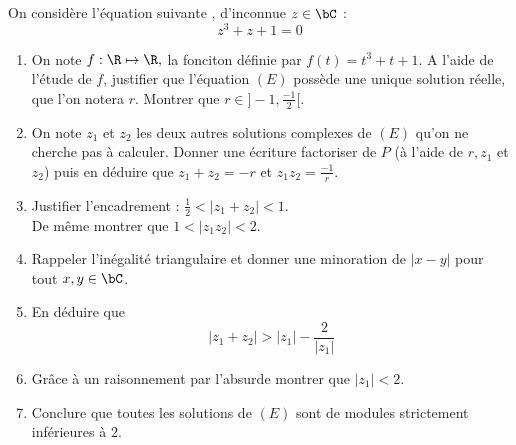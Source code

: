 \documentclass[a4paper, 11pt,reqno]{article}
\begin{document}
\begin{exercice}
On considère l'équation suivante , d'inconnue $z\in \bC$ : 
\begin{equation}\tag{$E$}
z^3 +z+1=0
\end{equation} 



\begin{enumerate}
\item On note $f : \R\mapsto \R, $ la fonciton définie par $f(t) = t^3+t+1.$
A l'aide de l'étude de $f$, justifier que l'équation $(E)$ possède une unique solution réelle, que l'on notera $r$. Montrer que $r \in ]-1, \frac{-1}{2}[$.
\item On note $z_1$ et $z_2$ les deux autres solutions complexes de $(E)$ qu'on ne cherche pas à calculer. %
Donner une écriture factoriser de $P$ (à l'aide de $r, z_1$ et $z_2$) puis   en déduire que $z_1+z_2=-r$ et $z_1z_2=\frac{-1}{r}$.
\item Justifier l'encadrement  : $\frac{1}{2}<|z_1+z_2 |<1.$\\
De même montrer que  $1< |z_1z_2|< 2.$
\item Rappeler l'inégalité triangulaire et donner une minoration de $|x-y|$ pour tout $x,y\in \bC$. 

\item En déduire que $$|z_1+z_2| >|z_1| -\frac{2}{|z_1|}$$

\item Grâce à un raisonnement par l'absurde montrer que $|z_1|<2$.



\item Conclure que toutes les solutions de $(E)$ sont de modules strictement inférieures à $2$. 

%
%


\end{enumerate}

\end{exercice}
\end{document}
